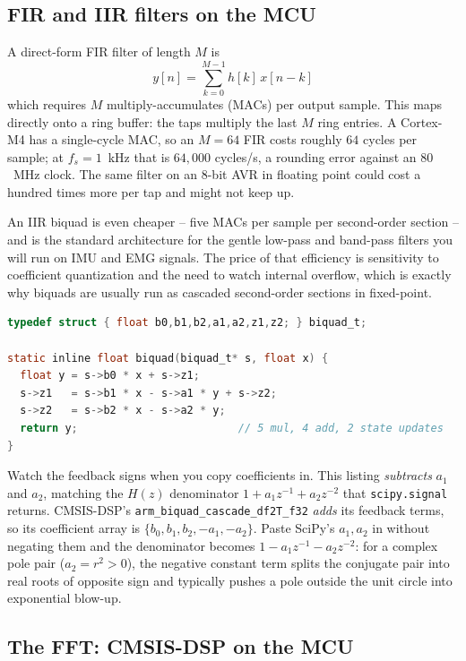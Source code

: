\subsection{FIR and IIR filters on the MCU}

A direct-form FIR filter of length $M$ is
\[
  y[n] = \sum_{k=0}^{M-1} h[k]\,x[n-k]
\]
which requires $M$ multiply-accumulates (MACs) per output sample. This maps directly onto a ring buffer: the taps multiply
the last $M$ ring entries. A Cortex-M4 has a single-cycle MAC, so an $M=64$ FIR costs roughly $64$
cycles per sample; at $f_s=1$~kHz that is $64{,}000$ cycles/s, a rounding error against an
$80$~MHz clock. The same filter on an 8-bit AVR in floating point could cost a hundred times more
per tap and might not keep up.

An IIR biquad is even cheaper -- five MACs per sample per second-order section -- and is the
standard architecture for the gentle low-pass and band-pass filters you will run on IMU and EMG signals. The
price of that efficiency is sensitivity to coefficient quantization and the need to watch internal
overflow, which is exactly why biquads are usually run as cascaded second-order sections in
fixed-point.

\begin{lstlisting}[language=C, caption={A single biquad (Direct Form II transposed), float version.}]
typedef struct { float b0,b1,b2,a1,a2,z1,z2; } biquad_t;

static inline float biquad(biquad_t* s, float x) {
  float y = s->b0 * x + s->z1;
  s->z1   = s->b1 * x - s->a1 * y + s->z2;
  s->z2   = s->b2 * x - s->a2 * y;
  return y;                         // 5 mul, 4 add, 2 state updates
}
\end{lstlisting}

Watch the feedback signs when you copy coefficients in. This listing \emph{subtracts}
$a_1$ and $a_2$, matching the $H(z)$ denominator $1 + a_1 z^{-1} + a_2 z^{-2}$ that
\texttt{scipy.signal} returns. CMSIS-DSP's \texttt{arm\_biquad\_\allowbreak cascade\_\allowbreak df2T\_f32}
\emph{adds} its feedback terms, so its coefficient array is
$\{b_0, b_1, b_2, -a_1, -a_2\}$. Paste SciPy's $a_1, a_2$ in without negating them and the
denominator becomes $1 - a_1 z^{-1} - a_2 z^{-2}$: for a complex pole pair ($a_2 = r^2 > 0$),
the negative constant term splits the conjugate pair into real roots of opposite sign and
typically pushes a pole outside the unit circle into exponential blow-up.

\subsection{The FFT: CMSIS-DSP on the MCU}

